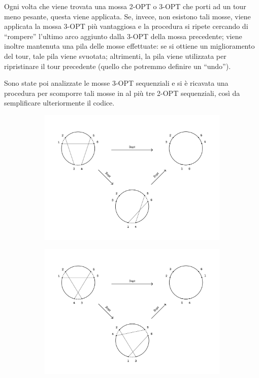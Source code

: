 Ogni volta che viene trovata una mossa 2-OPT o 3-OPT che porti ad un tour meno pesante, questa viene applicata.
Se, invece, non esistono tali mosse, viene applicata la mossa 3-OPT più vantaggiosa e la procedura si ripete 
cercando di ``rompere'' l'ultimo arco aggiunto dalla 3-OPT della mossa precedente; viene inoltre mantenuta 
una pila delle mosse effettuate: se si ottiene un miglioramento del tour, tale pila viene svuotata; altrimenti, 
la pila viene utilizzata per ripristinare il tour precedente (quello che potremmo definire un ``undo'').

Sono state poi analizzate le mosse 3-OPT sequenziali e si è ricavata una procedura per scomporre tali mosse in 
al più tre 2-OPT sequenziali, così da semplificare ulteriormente il codice.

\begin{figure}[H]
    \centering
    \begin{subfigure}{\linewidth}
        \centering
        \includegraphics[width=340pt]{img/schemaH.jpg}
        \caption{}
    \end{subfigure}
    \begin{subfigure}{\linewidth}
        \centering
        \includegraphics[width=340pt]{img/schemaXX.jpg}

\end{subfigure}
\end{figure}
